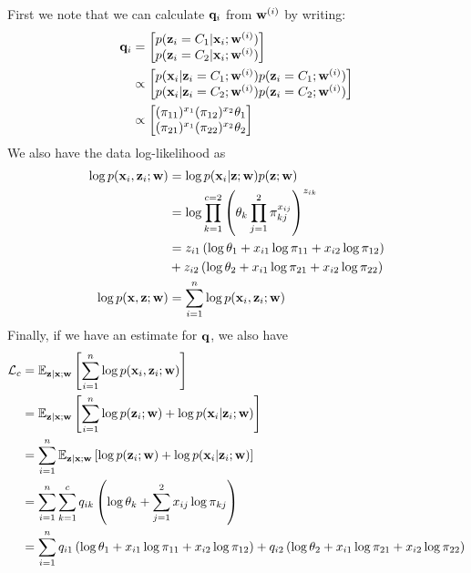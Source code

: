 \documentclass[12pt,letterpaper]{article}
\begin{document}
\noindent First we note that we can calculate $\mathbf{q}_i$ from $\mathbf{w}^{(i)}$ by writing:
	\begin{align}
		\mathbf{q}_i &= \begin{bmatrix}p(\mathbf{z}_i = C_1 | \mathbf{x}_i; \mathbf{w}^{(i)}) \\ p(\mathbf{z}_i = C_2 | \mathbf{x}_i; \mathbf{w}^{(i)})\end{bmatrix} \\
		    &\propto \begin{bmatrix}p(\mathbf{x}_i | \mathbf{z}_i = C_1; \mathbf{w}^{(i)})p(\mathbf{z}_i = C_1; \mathbf{w}^{(i)}) \\ p(\mathbf{x}_i | \mathbf{z}_i = C_2; \mathbf{w}^{(i)})p(\mathbf{z}_i = C_2; \mathbf{w}^{(i)})\end{bmatrix} \\
			&\propto \begin{bmatrix}(\pi_{11})^{x_1}(\pi_{12})^{x_2}\theta_1\\ (\pi_{21})^{x_1}(\pi_{22})^{x_2}\theta_2\end{bmatrix}
	\end{align}
\noindent We also have the data log-likelihood as
	\begin{align}
	\log p(\mathbf{x}_i, \mathbf{z}_i; \mathbf{w}) &= \log p(\mathbf{x}_i | \mathbf{z}; \mathbf{w})p(\mathbf{z}; \mathbf{w})\\
	    &= \log \prod_{k = 1}^{c = 2}\left(\theta_k\prod_{j = 1}^{2}\pi_{kj}^{x_{ij}}\right)^{z_{ik}}\\
	    &= z_{i1}\left(\log\theta_1 + x_{i1}\log \pi_{11} + x_{i2}\log \pi_{12}\right) \\
	    &+ z_{i2}\left(\log\theta_2 + x_{i1}\log \pi_{21} + x_{i2}\log \pi_{22}\right) \\
    \log p(\mathbf{x}, \mathbf{z}; \mathbf{w}) &= \sum_{i = 1}^n \log p(\mathbf{x}_i, \mathbf{z}_i; \mathbf{w})
	\end{align}
\noindent Finally, if we have an estimate for $\mathbf{q}$, we also have
	\begin{align}
		\mathcal{L}_{c} &= \mathbb{E}_{\mathbf{z} | \mathbf{x} ; \mathbf{w}}\left[\sum_{i = 1}^n \log p(\mathbf{x}_i, \mathbf{z}_i; \mathbf{w})\right]\\
		&= \mathbb{E}_{\mathbf{z} | \mathbf{x} ; \mathbf{w}} \left[\sum_{i=1}^n\log p(\mathbf{z}_i ; \mathbf{w}) + \log p(\mathbf{x}_i | \mathbf{z}_i ; \mathbf{w}) \right] \\
		&= \sum_{i = 1}^n \mathbb{E}_{\mathbf{z} | \mathbf{x} ; \mathbf{w}} \left[ \log p(\mathbf{z}_i ; \mathbf{w}) + \log p(\mathbf{x}_i | \mathbf{z}_i ; \mathbf{w})\right]\\
		&= \sum_{i = 1}^n \sum_{k = 1}^c q_{ik}\left(\log \theta_k + \sum_{j = 1}^2 x_{ij} \log \pi_{kj}\right) \\
		&= \sum_{i = 1}^n q_{i1}\left(\log\theta_1 + x_{i1}\log \pi_{11} + x_{i2}\log \pi_{12}\right) + q_{i2}\left(\log\theta_2 + x_{i1}\log \pi_{21} + x_{i2}\log \pi_{22}\right)
	\end{align}
\end{document}
